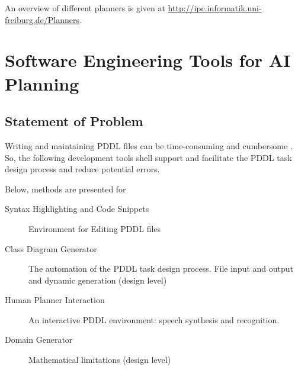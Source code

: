 \documentclass[11pt]{report}
\begin{document}
An overview of different planners is given at
\url{http://ipc.informatik.uni-freiburg.de/Planners}.
\chapter{Software Engineering Tools for AI Planning}
\label{sec-4}
\begin{center}
\end{center}

\section{Statement of Problem}
\label{sec-4-1}
Writing and maintaining PDDL files can be time-consuming and
cumbersome \textcite{li2012translating}. So, the following development
tools shell support and facilitate the PDDL task design process and
reduce potential errors.

Below, methods are presented for

\begin{description}
\item[{Syntax Highlighting and Code Snippets}] Environment for Editing
PDDL files
\item[{Class Diagram Generator}] The automation of the PDDL task design process. File
input and output and dynamic generation (design level)
\item[{Human Planner Interaction}] An interactive PDDL environment: speech synthesis and
recognition.
\item[{Domain Generator}] Mathematical limitations (design level)
\end{description}
\end{document}
